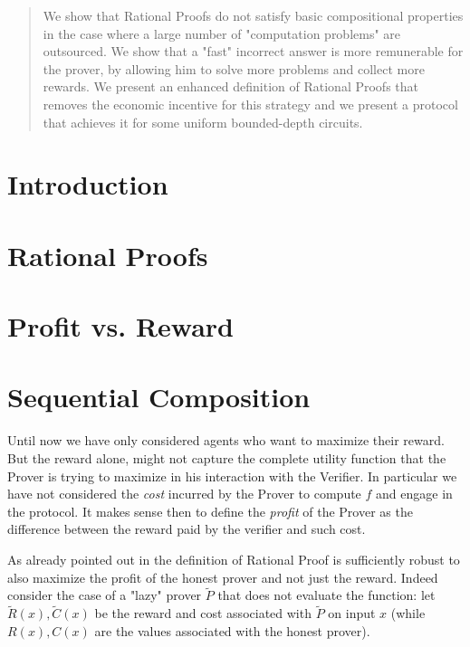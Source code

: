 \begin{abstract}
We show that Rational Proofs  do not satisfy basic compositional properties in the case where a large number of "computation problems" are outsourced. We show that a "fast" incorrect answer is more remunerable for the prover, by allowing him to solve more problems and collect more rewards.
We present an enhanced definition of Rational Proofs that removes the economic incentive  for this strategy and we present a protocol that achieves it for
some
uniform bounded-depth circuits.
\end{abstract}

%

\section{Introduction}


\section{Rational Proofs}


\section{Profit vs. Reward}


\section{Sequential Composition}
Until now we have only considered agents who want to maximize their reward. But the reward alone, might not capture the complete utility function that the Prover is trying to maximize in his interaction with the Verifier. In particular we have not considered the 
{\em cost} incurred by the Prover to compute $f$ and engage in the protocol. It makes 
sense then to define the  {\em profit} of the Prover as the difference between the reward paid by the verifier and such cost. 


As already pointed out in \cite{am1,ratargs} the definition of Rational Proof is sufficiently robust to also maximize the profit of the honest prover and not just the reward. Indeed consider the case of a "lazy" prover $\tilde{P}$ that does not evaluate the function: let $\tilde{R}(x), \tilde{C}(x)$ be the reward and cost associated with $\tilde{P}$ on input $x$ (while $R(x),C(x)$ are the values associated with the honest prover). 

